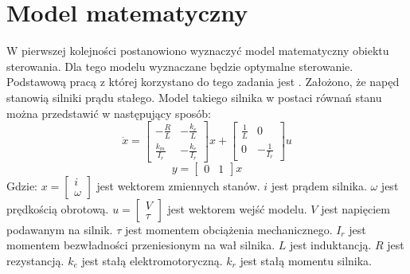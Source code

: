 \section{Model matematyczny}
\label{sec:model}

W pierwszej kolejności postanowiono wyznaczyć model matematyczny obiektu sterowania. Dla tego modelu wyznaczane będzie optymalne sterowanie. Podstawową pracą z której korzystano do tego zadania jest \cite{Babazadeh}. Założono, że napęd stanowią silniki prądu stałego. Model takiego silnika w postaci równań stanu można przedstawić w następujący sposób:
\begin{equation}
\dot{x}=
\begin{bmatrix}
	-\frac{R}{L} & -\frac{k_e}{L} \\
	\frac{k_m}{I_r} & -\frac{k_e}{I_r}
\end{bmatrix}
x+
\begin{bmatrix}
	\frac{1}{L} & 0 \\
	0 & -\frac{1}{I_r}
\end{bmatrix}
u
\label{eq:dc_model_x}
\end{equation}
\begin{equation}
y=
\begin{bmatrix}
	0 & 1
\end{bmatrix}
x
\label{eq:dc_model_y}
\end{equation}
\noindent Gdzie:\newline
\(x=
\begin{bmatrix}
	i \\
	\omega
\end{bmatrix}\) jest wektorem zmiennych stanów.\newline
\(i\) jest prądem silnika.\newline
\(\omega\) jest prędkością obrotową.\newline
\(u=
\begin{bmatrix}
	V \\
	\tau
\end{bmatrix}\) jest wektorem wejść modelu.\newline
\(V\) jest napięciem podawanym na silnik.\newline
\(\tau\) jest momentem obciążenia mechanicznego.\newline
\(I_r\) jest momentem bezwładności przeniesionym na wał silnika.\newline
\(L\) jest induktancją.\newline
\(R\) jest rezystancją.\newline
\(k_e\) jest stałą elektromotoryczną.\newline
\(k_r\) jest stałą momentu silnika.

